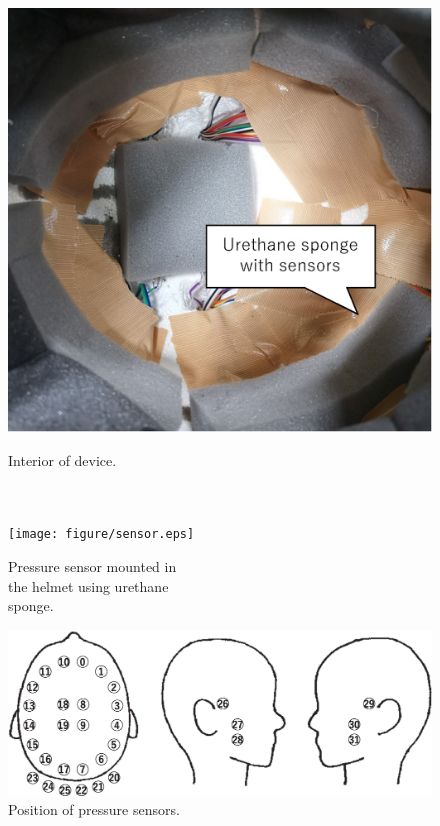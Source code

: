 \documentclass[english,preprint,JIP]{ipsj}
\begin{document}
\begin{figure}[!t]
\begin{minipage}{0.48\hsize}
\begin{center}
        \includegraphics[width=1\linewidth]{figure/met_in.eps}
  \end{center}
  \caption{Interior of device.\\~\\~}
  \label{fig:met_in}
  \end{minipage}
\begin{minipage}{0.48\hsize}
\begin{center}
        \texttt{[image: figure/sensor.eps]}
        \end{center}
  \caption{Pressure sensor mounted in\\the helmet using urethane\\sponge.}
  \label{fig:sensor}
  \end{minipage}
\end{figure}

\begin{figure}[!t]
  \begin{center}
    \includegraphics[width=1\linewidth]{figure/position.eps}
  \end{center}
  \caption{Position of pressure sensors.}
  \label{fig:position}
\end{figure}
\end{document}
